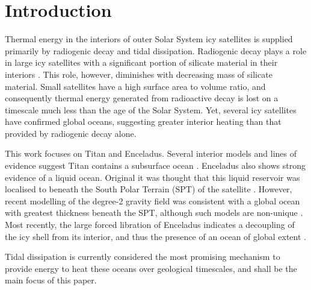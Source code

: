 \newpage
\section{Introduction}


Thermal energy in the interiors of outer Solar System icy satellites is supplied primarily by radiogenic decay and tidal dissipation. Radiogenic decay plays a role in large icy satellites with a significant portion of silicate material in their interiors \citep{hussmann2006subsurface}. This role, however, diminishes with decreasing mass of silicate material. Small satellites have a high surface area to volume ratio, and consequently thermal energy generated from radioactive decay is lost on a timescale much less than the age of the Solar System. Yet, several icy satellites have confirmed global oceans, suggesting greater interior heating than that provided by radiogenic decay alone.


This work focuses on Titan and Enceladus. Several interior models and lines of evidence suggest Titan contains a subsurface ocean \citep{sohl2003interior, bills2011rotational, iess2012tides, baland2014titan, mitri2014shape, sohl2014structural}. Enceladus also shows strong evidence of a liquid ocean. Original it was thought that this liquid reservoir was localised to beneath the South Polar Terrain (SPT) of the satellite \citep[e.g.,][]{collins2007enceladus}. However, recent modelling of the degree-2 gravity field was consistent with a global ocean with greatest thickness beneath the SPT, although such models are non-unique \citep{iess2014gravity,mckinnon2015effect}. Most recently, the large forced libration of Enceladus indicates a decoupling of the icy shell from its interior, and thus the presence of an ocean of global extent \citep{thomas2015enceladus}.  

Tidal dissipation is currently considered the most promising mechanism to provide energy to heat these oceans over geological timescales, and shall be the main focus of this paper.

